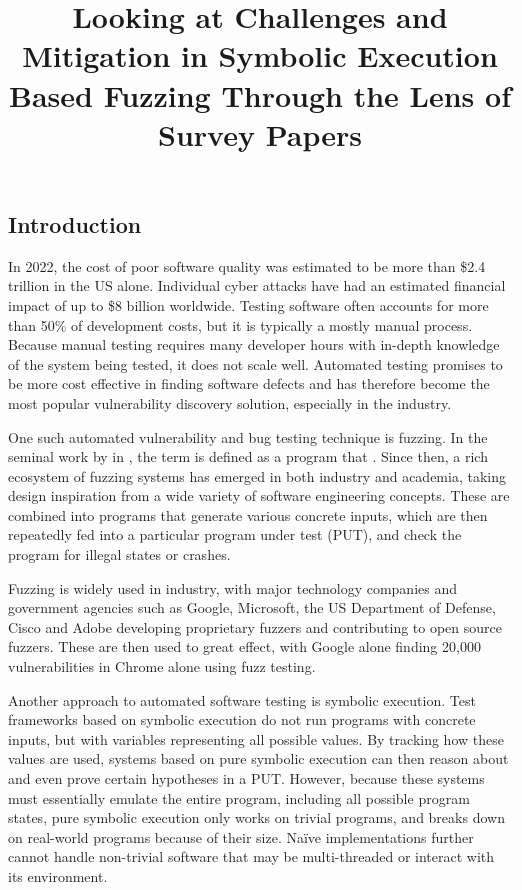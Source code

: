 \documentclass{article}
\title{Looking at Challenges and Mitigation in Symbolic Execution Based Fuzzing Through the Lens of Survey Papers}
\begin{document}


\maketitle
\begin{multicols}{2}
  \tableofcontents

  \section{Introduction}
  In 2022, the cost of poor software quality was estimated to be more than \$2.4 trillion in the US alone.\cite{CostPoorSoftware} Individual cyber attacks have had an estimated financial impact of up to \$8 billion worldwide.\cite{Demystifying} Testing software often accounts for more than 50\% of development costs\cite{Orchestrated}, but it is typically a mostly manual process\cite{PreliminaryAssessment}. Because manual testing requires many developer hours with in-depth knowledge of the system being tested, it does not scale well. Automated testing promises to be more cost effective in finding software defects and has therefore become the most popular vulnerability discovery solution, especially in the industry.\cite{FuzzingASurvey}

  One such automated vulnerability and bug testing technique is fuzzing.\cite{VulnerabilityDiscoveryTechniques} In the seminal work by \citeauthor{UNIX} in \citeyear{UNIX}, the term  is defined as a program that \cite{UNIX}. Since then, a rich ecosystem of fuzzing systems has emerged in both industry and academia, taking design inspiration from a wide variety of software engineering concepts. These are combined into programs that generate various concrete inputs, which are then repeatedly fed into a particular program under test (PUT), and check the program for illegal states or crashes.\cite{EvaluatingFuzzTesting}

  Fuzzing is widely used in industry, with major technology companies and government agencies such as Google, Microsoft, the US Department of Defense, Cisco and Adobe developing proprietary fuzzers and contributing to open source fuzzers. These are then used to great effect, with Google alone finding 20,000 vulnerabilities in Chrome alone using fuzz testing.\cite{Demystifying}

  Another approach to automated software testing is symbolic execution\cite{Symbex}. Test frameworks based on symbolic execution do not run programs with concrete inputs, but with variables representing all possible values. By tracking how these values are used, systems based on pure symbolic execution can then reason about and even prove certain hypotheses in a PUT. However, because these systems must essentially emulate the entire program, including all possible program states, pure symbolic execution only works on trivial programs, and breaks down on real-world programs because of their size. Naïve implementations further cannot handle non-trivial software that may be multi-threaded or interact with its environment.


\end{multicols}
\end{document}
